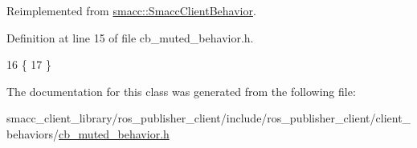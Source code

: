 Reimplemented from \hyperlink{classsmacc_1_1SmaccClientBehavior_ac0cd72d42bd00425362a97c9803ecce5}{smacc\+::\+Smacc\+Client\+Behavior}.



Definition at line 15 of file cb\+\_\+muted\+\_\+behavior.\+h.


\begin{DoxyCode}
16     \{
17     \}
\end{DoxyCode}


The documentation for this class was generated from the following file\+:\begin{DoxyCompactItemize}
\item 
smacc\+\_\+client\+\_\+library/ros\+\_\+publisher\+\_\+client/include/ros\+\_\+publisher\+\_\+client/client\+\_\+behaviors/\hyperlink{cb__muted__behavior_8h}{cb\+\_\+muted\+\_\+behavior.\+h}\end{DoxyCompactItemize}
